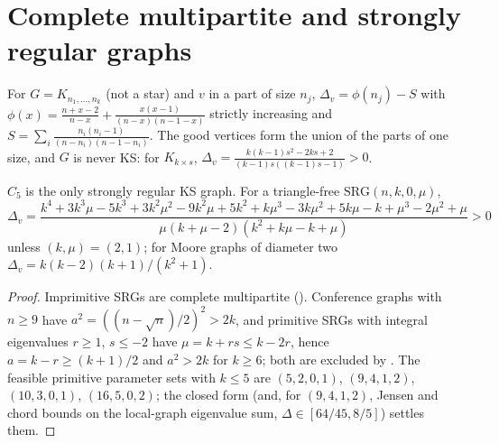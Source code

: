 \documentclass[11pt,a4paper]{report}
\begin{document}
\section{Complete multipartite and strongly regular graphs}
\begin{theorem}\label{thm:multipartite}
For $G=K_{n_1,\dots,n_k}$ (not a star) and $v$ in a part of size $n_j$, $\Delta_v=\phi(n_j)-S$ with
$\phi(x)=\frac{n+x-2}{n-x}+\frac{x(x-1)}{(n-x)(n-1-x)}$ strictly increasing and
$S=\sum_i\frac{n_i(n_i-1)}{(n-n_i)(n-1-n_i)}$. The good vertices form the union of the parts of one size, and
$G$ is never KS: for $K_{k\times s}$, $\Delta_v=\frac{k(k-1)s^2-2ks+2}{(k-1)s((k-1)s-1)}>0$.
\end{theorem}
\begin{theorem}\label{thm:srg}
$C_5$ is the only strongly regular KS graph. For a triangle-free $\mathrm{SRG}(n,k,0,\mu)$,
\[
\Delta_v=\frac{k^4+3k^3\mu-5k^3+3k^2\mu^2-9k^2\mu+5k^2+k\mu^3-3k\mu^2+5k\mu-k+\mu^3-2\mu^2+\mu}{\mu(k+\mu-2)(k^2+k\mu-k+\mu)}>0
\]
unless $(k,\mu)=(2,1)$; for Moore graphs of diameter two $\Delta_v=k(k-2)(k+1)/(k^2+1)$.
\end{theorem}
\begin{proof}
Imprimitive SRGs are complete multipartite (). Conference graphs with $n\ge9$ have
$a^2=((n-\sqrt n)/2)^2>2k$, and primitive SRGs with integral eigenvalues $r\ge1$, $s\le-2$ have
$\mu=k+rs\le k-2r$, hence $a=k-r\ge(k+1)/2$ and $a^2>2k$ for $k\ge6$; both are excluded by
. The feasible primitive parameter sets with $k\le5$ are $(5,2,0,1)$, $(9,4,1,2)$,
$(10,3,0,1)$, $(16,5,0,2)$; the closed form (and, for $(9,4,1,2)$, Jensen and chord bounds on the local-graph
eigenvalue sum, $\Delta\in[64/45,8/5]$) settles them.
\end{proof}
\end{document}
